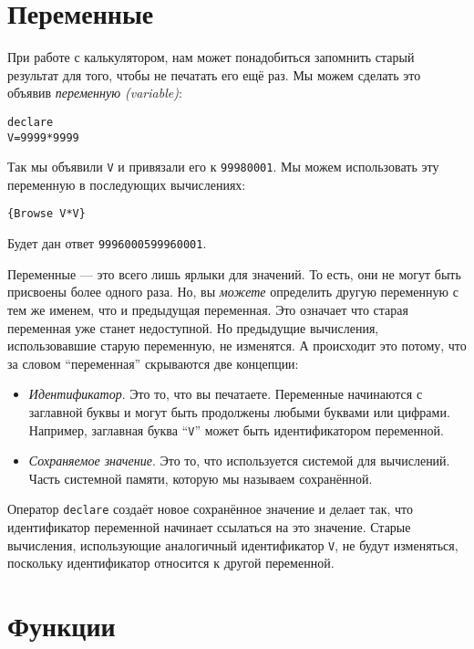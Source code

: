 \section{Переменные}

При работе с калькулятором, нам может понадобиться запомнить старый результат для того, чтобы не печатать его ещё раз. Мы можем сделать это объявив \emph{переменную (variable)}:

\begin{lstlisting}
declare
V=9999*9999
\end{lstlisting}

Так мы объявили \lstinline!V! и привязали его к \lstinline!99980001!. Мы можем использовать эту переменную в последующих вычислениях:

\begin{lstlisting}
{Browse V*V}
\end{lstlisting}

Будет дан ответ \lstinline!9996000599960001!.

Переменные --- это всего лишь ярлыки для значений. То есть, они не могут быть присвоены более одного раза. Но, вы \emph{можете} определить другую переменную с тем же именем, что и предыдущая переменная. Это означает что старая переменная уже станет недоступной. Но предыдущие вычисления, использовавшие старую переменную, не изменятся. А происходит это потому, что за словом ``переменная'' скрываются две концепции:

\begin{itemize}
\item{\emph{Идентификатор}. Это то, что вы печатаете. Переменные начинаются с заглавной буквы и могут быть продолжены любыми буквами или цифрами. Например, заглавная буква ``\lstinline!V!'' может быть идентификатором переменной.}

\item{\emph{Сохраняемое значение}. Это то, что используется системой для вычислений. Часть системной памяти, которую мы называем сохранённой.}
\end{itemize}

Оператор \lstinline!declare! создаёт новое сохранённое значение и делает так, что идентификатор переменной начинает ссылаться на это значение. Старые вычисления, использующие аналогичный идентификатор \lstinline!V!, не будут изменяться, поскольку идентификатор относится к другой переменной.

\section{Функции}\label{section:Functions}

